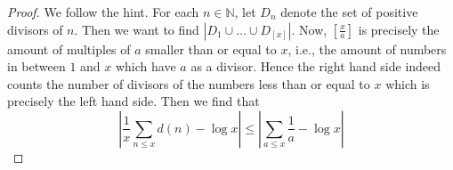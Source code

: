 \documentclass[reqno]{amsart}
\theoremstyle{definition}
\theoremstyle{remark}
\begin{document}
\begin{proof}
    We follow the hint.
    For each $n \in \mathbb{N} $, let
    $D_n$ denote the set of positive divisors of
    $n$. Then we want to find
    $\left| D_1 \cup \ldots \cup D_{\left[ x \right] } \right|  $.
    Now, $\left[ \frac{x}{a} \right] $ is precisely
    the amount of multiples of $a$ smaller than or equal to
    $x$, i.e., the amount of numbers in between $1$ and
    $x$ which have $a$ as a divisor.
    Hence the right hand side indeed counts the
    number of divisors of the numbers less than or equal to
     $x$ which is precisely the left hand side.
     Then we find that
     \[
     \left| \frac{1}{x}\sum_{n\le x} d(n) - \log x \right| 
     \le  \left|  \sum_{a \le x} \frac{1}{a} - \log x \right|
     \] 
\end{proof}

\end{document}
